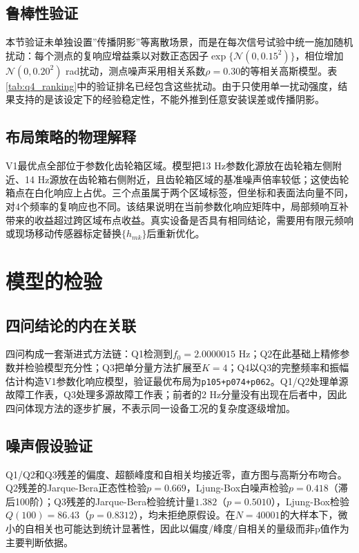 \documentclass[withoutpreface,bwprint]{cumcmthesis}
\begin{document}
\subsection{鲁棒性验证}
本节验证未单独设置”传播阴影”等离散场景，而是在每次信号试验中统一施加随机扰动：每个测点的复响应增益乘以对数正态因子$\exp\{\mathcal N(0,0.15^2)\}$，相位增加$\mathcal N(0,0.20^2)$ rad扰动，测点噪声采用相关系数$\rho=0.30$的等相关高斯模型。表\ref{tab:q4_ranking}中的验证排名已经包含这些扰动。由于只使用单一扰动强度，结果支持的是该设定下的经验稳定性，不能外推到任意安装误差或传播阴影。

\subsection{布局策略的物理解释}
V1最优点全部位于参数化齿轮箱区域。模型把13 Hz参数化源放在齿轮箱左侧附近、14 Hz源放在齿轮箱右侧附近，且齿轮箱区域的基准噪声倍率较低；这使齿轮箱点在白化响应上占优。三个点虽属于两个区域标签，但坐标和表面法向量不同，对4个频率的复响应也不同。该结果说明在当前参数化响应矩阵中，局部频响互补带来的收益超过跨区域布点收益。真实设备是否具有相同结论，需要用有限元频响或现场移动传感器标定替换$\{h_{mk}\}$后重新优化。

\section{模型的检验}
\subsection{四问结论的内在关联}
四问构成一套渐进式方法链：Q1检测到$f_0=2.0000015$ Hz；Q2在此基础上精修参数并检验模型充分性；Q3把单分量方法扩展至$K=4$；Q4以Q3的完整频率和振幅估计构造V1参数化响应模型，验证最优布局为\texttt{p105+p074+p062}。Q1/Q2处理单源故障工作表，Q3处理多源故障工作表；前者的2 Hz分量没有出现在后者中，因此四问体现方法的逐步扩展，不表示同一设备工况的复杂度逐级增加。

\subsection{噪声假设验证}
Q1/Q2和Q3残差的偏度、超额峰度和自相关均接近零，直方图与高斯分布吻合。Q2残差的Jarque-Bera正态性检验$p=0.669$，Ljung-Box白噪声检验$p=0.418$（滞后100阶）；Q3残差的Jarque-Bera检验统计量$1.382$（$p=0.5010$），Ljung-Box检验$Q(100)=86.43$（$p=0.8312$），均未拒绝原假设。在$N=40001$的大样本下，微小的自相关也可能达到统计显著性，因此以偏度/峰度/自相关的量级而非p值作为主要判断依据。
\end{document}
